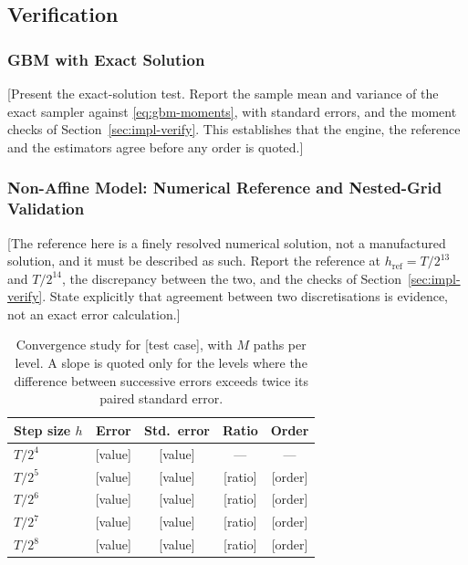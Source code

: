 \documentclass[11pt,a4paper]{article}
\theoremstyle{definition}
\theoremstyle{remark}
\begin{document}
\subsection{Verification}
\label{sec:verification}

\subsubsection{GBM with Exact Solution}

[Present the exact-solution test. Report the sample mean and variance of the
exact sampler against \eqref{eq:gbm-moments}, with standard errors, and the
moment checks of Section~\ref{sec:impl-verify}. This establishes that the
engine, the reference and the estimators agree before any order is quoted.]

\subsubsection{Non-Affine Model: Numerical Reference and Nested-Grid Validation}

[The reference here is a finely resolved numerical solution, not a manufactured
solution, and it must be described as such. Report the reference at
$h_{\mathrm{ref}} = T/2^{13}$ and $T/2^{14}$, the discrepancy between the two,
and the checks of Section~\ref{sec:impl-verify}. State explicitly that
agreement between two discretisations is evidence, not an exact error
calculation.]

\begin{table}[H]
\centering
\begin{tabular}{lcccc}
\toprule
\textbf{Step size $h$} & \textbf{Error} & \textbf{Std.\ error}
    & \textbf{Ratio} & \textbf{Order} \\
\midrule
$T/2^{4}$   & [value] & [value] & ---     & ---     \\
$T/2^{5}$   & [value] & [value] & [ratio] & [order] \\
$T/2^{6}$   & [value] & [value] & [ratio] & [order] \\
$T/2^{7}$   & [value] & [value] & [ratio] & [order] \\
$T/2^{8}$   & [value] & [value] & [ratio] & [order] \\
\bottomrule
\end{tabular}
\caption{Convergence study for [test case], with $M$ paths per level. A slope is
quoted only for the levels where the difference between successive errors
exceeds twice its paired standard error.}
\label{tab:convergence}
\end{table}
\end{document}
